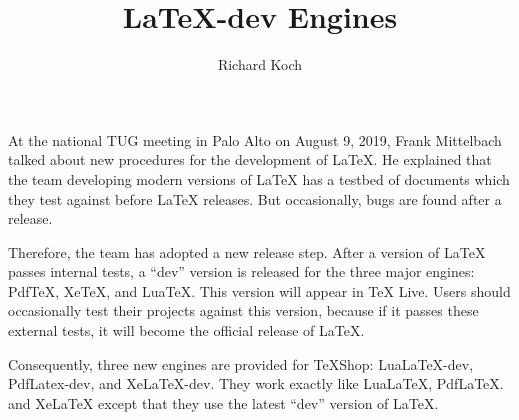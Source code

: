 \documentclass[11pt, oneside]{article}   	%
\title{LaTeX-dev Engines}
\author{Richard Koch}
\begin{document}
\maketitle
At the national TUG meeting in Palo Alto on August 9, 2019, Frank Mittelbach talked about new procedures for the development of LaTeX. He explained that the  team developing modern versions of LaTeX has  a  testbed of documents which they test against before LaTeX releases. But occasionally, bugs are found after a release.

Therefore, the team has adopted a new release step. After a version of LaTeX passes internal tests, a ``dev'' version is released for the three major engines: PdfTeX, XeTeX, and LuaTeX. This version will appear in TeX Live. Users should occasionally test  their projects against this version, because if it passes these external tests, it will become the official release of LaTeX.

Consequently, three new engines are provided for TeXShop: LuaLaTeX-dev, PdfLatex-dev, and XeLaTeX-dev. They work exactly like LuaLaTeX, PdfLaTeX. and XeLaTeX except that they use the latest ``dev'' version of LaTeX. 
\end{document}
